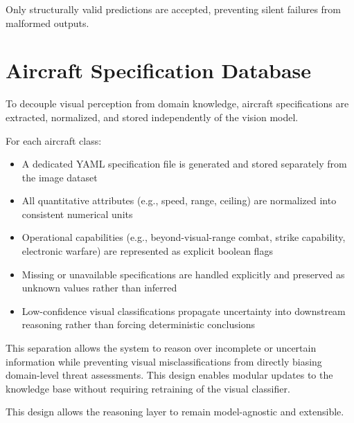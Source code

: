 \documentclass[11pt]{article}
\begin{document}
Only structurally valid predictions are accepted, preventing silent failures from malformed outputs.

\section*{Aircraft Specification Database}

To decouple visual perception from domain knowledge, aircraft specifications are extracted, normalized, and stored independently of the vision model.

For each aircraft class:
\begin{itemize}
    \item A dedicated YAML specification file is generated and stored separately from the image dataset
    \item All quantitative attributes (e.g., speed, range, ceiling) are normalized into consistent numerical units
    \item Operational capabilities (e.g., beyond-visual-range combat, strike capability, electronic warfare) are represented as explicit boolean flags
    \item Missing or unavailable specifications are handled explicitly and preserved as unknown values rather than inferred
    \item Low-confidence visual classifications propagate uncertainty into downstream reasoning rather than forcing deterministic conclusions
\end{itemize}

This separation allows the system to reason over incomplete or uncertain information while preventing visual misclassifications from directly biasing domain-level threat assessments.
This design enables modular updates to the knowledge base without requiring retraining of the visual classifier.



This design allows the reasoning layer to remain model-agnostic and extensible.

\vspace{0.5em}
\noindent
\end{document}

